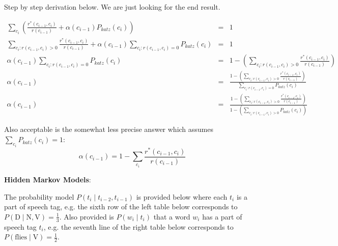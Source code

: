 \documentclass[11pt]{article}
\begin{document}
\begin{exe}
\begin{soln}

Step by step derivation below. We are just looking for the end result.

\begin{eqnarray*}
\sum_{c_i} \left( \frac{r^\ast(c_{i-1}, c_i)}{r(c_{i-1})} + \alpha(c_{i-1}) P_\textit{katz}(c_i) \right) &=& 1 \\
\sum_{c_i : r(c_{i-1}, c_i) > 0} \frac{r^\ast(c_{i-1}, c_i)}{r(c_{i-1})} + \alpha(c_{i-1}) \sum_{c_i : r(c_{i-1}, c_i) = 0} P_\textit{katz}(c_i) &=& 1 \\
\alpha(c_{i-1}) \sum_{c_i : r(c_{i-1}, c_i) = 0} P_\textit{katz}(c_i) &=& 1 - \left( \sum_{c_i : r(c_{i-1}, c_i) > 0} \frac{r^\ast(c_{i-1}, c_i)}{r(c_{i-1})}  \right) \\
\alpha(c_{i-1}) &=& \frac{1 - \left( \sum_{c_i : r(c_{i-1}, c_i) > 0} \frac{r^\ast(c_{i-1}, c_i)}{r(c_{i-1})}  \right)}{\sum_{c_i : r(c_{i-1}, c_i) = 0} P_\textit{katz}(c_i)} \\
\alpha(c_{i-1}) &=& \frac{1 - \left( \sum_{c_i : r(c_{i-1}, c_i) > 0} \frac{r^\ast(c_{i-1}, c_i)}{r(c_{i-1})}  \right)}{1 - \left( \sum_{c_i : r(c_{i-1}, c_i) > 0} P_\textit{katz}(c_i) \right) } 
\end{eqnarray*}

Also acceptable is the somewhat less precise answer which assumes $\sum_{c_i} P_\textit{katz}(c_i) = 1$:
\[ \alpha(c_{i-1}) = 1 - \sum_{c_i} \frac{ r^\ast(c_{i-1}, c_i) }{ r(c_{i-1}) } \]

\end{soln}

\bigskip
\ex\label{hmm} \textbf{Hidden Markov Models}:

The probability model $P(t_i \mid t_{i-2}, t_{i-1})$ 
is provided below 
where each $t_i$ is a part of speech tag, e.g. the sixth row of
the left table below corresponds to
$P(\textrm{D} \mid \textrm{N}, \textrm{V}) = \frac{1}{3}$. 
Also provided is $P(w_i \mid t_i)$ that a word $w_i$ has a part of speech 
tag $t_i$, e.g. the seventh line of the right table below corresponds to $P(\textrm{flies} \mid \textrm{V}) = \frac{1}{2}$. 


\end{exe}
\end{document}

